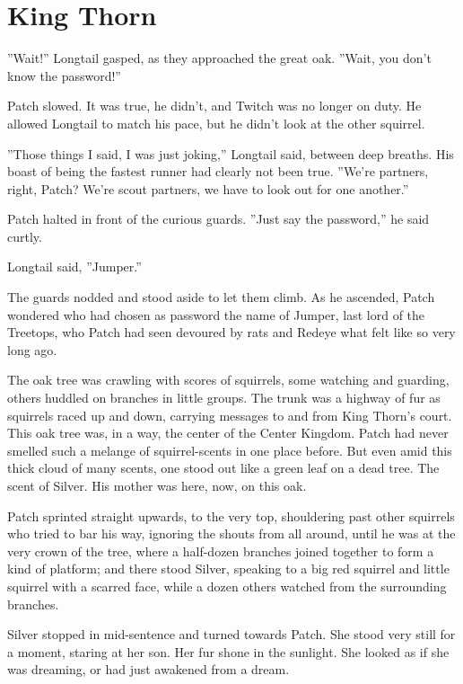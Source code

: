 \documentclass[12pt]{book}
\begin{document}
\section{King Thorn}

 ''Wait!'' Longtail gasped, as they approached the great oak. ''Wait, you don't know the password!''\par
 Patch slowed. It was true, he didn't, and Twitch was no longer on duty. He allowed Longtail to match his pace, but he didn't look at the other squirrel.\par
 ''Those things I said, I was just joking,'' Longtail said, between deep breaths. His boast of being the fastest runner had clearly not been true. ''We're partners, right, Patch? We're scout partners, we have to look out for one another.''\par
 Patch halted in front of the curious guards. ''Just say the password,'' he said curtly.\par
 Longtail said, ''Jumper.''\par
 The guards nodded and stood aside to let them climb. As he ascended, Patch wondered who had chosen as password the name of Jumper, last lord of the Treetops, who Patch had seen devoured by rats and Redeye what felt like so very long ago.\par
 The oak tree was crawling with scores of squirrels, some watching and guarding, others huddled on branches in little groups. The trunk was a highway of fur as squirrels raced up and down, carrying messages to and from King Thorn's court. This oak tree was, in a way, the center of the Center Kingdom. Patch had never smelled such a melange of squirrel-scents in one place before. But even amid this thick cloud of many scents, one stood out like a green leaf on a dead tree. The scent of Silver. His mother was here, now, on this oak.\par
 Patch sprinted straight upwards, to the very top, shouldering past other squirrels who tried to bar his way, ignoring the shouts from all around, until he was at the very crown of the tree, where a half-dozen branches joined together to form a kind of platform; and there stood Silver, speaking to a big red squirrel and little squirrel with a scarred face, while a dozen others watched from the surrounding branches.\par
 Silver stopped in mid-sentence and turned towards Patch. She stood very still for a moment, staring at her son. Her fur shone in the sunlight. She looked as if she was dreaming, or had just awakened from a dream.\par
\end{document}

